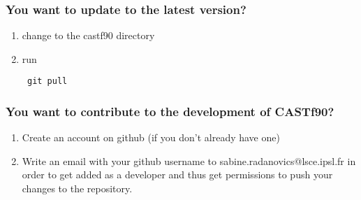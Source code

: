 \documentclass[11p,a4paper]{article}
\begin{document}
\subsubsection{You want to update to the latest version?}
\begin{enumerate}
\item change to the castf90 directory
\item run
\begin{verbatim}
 git pull
\end{verbatim}
\end{enumerate}
\subsubsection{You want to contribute to the development of CASTf90?}
\begin{enumerate}
 \item Create an account on github (if you don't already have one)
 \item Write an email with your github username to sabine.radanovics@lsce.ipsl.fr in order to get added as a developer and thus get permissions to push your changes to the repository.
\end{enumerate}
%
\end{document}
